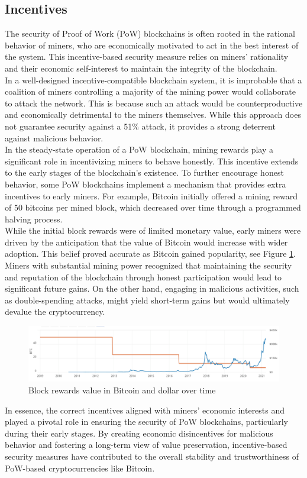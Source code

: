\subsection{Incentives}
The security of Proof of Work (PoW) blockchains is often rooted in the rational behavior of miners, who are economically motivated to act in the best interest of the system. This incentive-based security measure relies on miners' rationality and their economic self-interest to maintain the integrity of the blockchain.\\
In a well-designed incentive-compatible blockchain system, it is improbable that a coalition of miners controlling a majority of the mining power would collaborate to attack the network. This is because such an attack would be counterproductive and economically detrimental to the miners themselves. While this approach does not guarantee security against a 51\% attack, it provides a strong deterrent against malicious behavior.\\
In the steady-state operation of a PoW blockchain, mining rewards play a significant role in incentivizing miners to behave honestly. This incentive extends to the early stages of the blockchain's existence. To further encourage honest behavior, some PoW blockchains implement a mechanism that provides extra incentives to early miners. For example, Bitcoin initially offered a mining reward of $50$ bitcoins per mined block, which decreased over time through a programmed halving process.\\
While the initial block rewards were of limited monetary value, early miners were driven by the anticipation that the value of Bitcoin would increase with wider adoption. This belief proved accurate as Bitcoin gained popularity, see Figure \ref{fig:L18_f1}. Miners with substantial mining power recognized that maintaining the security and reputation of the blockchain through honest participation would lead to significant future gains. On the other hand, engaging in malicious activities, such as double-spending attacks, might yield short-term gains but would ultimately devalue the cryptocurrency.\\
\begin{center}
	\begin{figure}
		\centering
		\includegraphics[width=0.8\linewidth]{Fig/18/F1}
		\caption{Block rewards value in Bitcoin and dollar over time}
		\label{fig:L18_f1}
	\end{figure}
\end{center}
In essence, the correct incentives aligned with miners' economic interests and played a pivotal role in ensuring the security of PoW blockchains, particularly during their early stages. By creating economic disincentives for malicious behavior and fostering a long-term view of value preservation, incentive-based security measures have contributed to the overall stability and trustworthiness of PoW-based cryptocurrencies like Bitcoin.
